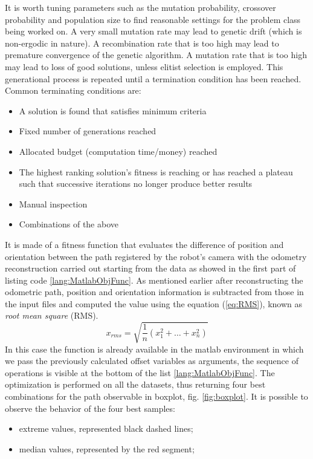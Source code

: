 It is worth tuning parameters such as the mutation probability, crossover probability and population size to find reasonable settings for the problem class being worked on. A very small mutation rate may lead to genetic drift (which is non-ergodic in nature). A recombination rate that is too high may lead to premature convergence of the genetic algorithm. A mutation rate that is too high may lead to loss of good solutions, unless elitist selection is employed.
This generational process is repeated until a termination condition has been reached. Common terminating conditions are:
\begin{itemize}
\item A solution is found that satisfies minimum criteria
\item Fixed number of generations reached
\item Allocated budget (computation time/money) reached
\item The highest ranking solution's fitness is reaching or has reached a plateau such that successive iterations no longer produce better results
\item Manual inspection
\item Combinations of the above
\end{itemize}
\noindent It is made of a fitness function that evaluates the difference of position and orientation between the path registered by the robot's camera with the odometry reconstruction carried out starting from the data as showed in the first part of listing code \ref{lang:MatlabObjFunc}. 
As mentioned earlier after reconstructing the odometric path, position and orientation information is subtracted from those in the input files and computed the value using the equation (\ref{eq:RMS}), known as \emph{root mean square} (RMS). 
\begin{equation}
x_{rms} = \sqrt{\frac{1}{n}(x_1^2 + \dots + x_n^2)}
\label{eq:RMS}
\end{equation}
In this case the function is already available in the matlab environment in which we pass the previously calculated offset variables as arguments, the sequence of operations is visible at the bottom of the list \ref{lang:MatlabObjFunc}.
The optimization is performed on all the datasets, thus returning four best combinations for the path observable in boxplot, fig. \ref{fig:boxplot}. It is possible to observe the behavior of the four best samples:
\begin{itemize}
\item extreme values, represented black dashed lines;
\item median values, represented by the red segment;
\end{itemize}
